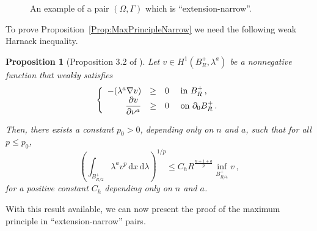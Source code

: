 \documentclass[twoside,leqno,symbols-for-thanks, draft]{rmi}
\numberwithin{equation}{section}
\newtheorem{proposition}[theorem]{Proposition}
\theoremstyle{definition}
\renewcommand{\d}{\,\mathrm{d}} %
\newcommand{\dx}{\,\mathrm{d}x} %
\newcommand\beqc[1]{\left\{\begin{array}{#1}}
\newcommand\eeqc{\end{array} \right.}
\def\PDEsystem{rcll}
\let\div\relax
\DeclareMathOperator{\div}{div}
\begin{document}
\begin{figure}
	
	\caption{An example of a pair $(\Omega,\Gamma)$ which is ``extension-narrow''\!.}
	\label{Fig:ExtensionNarrow}
\end{figure}


To prove Proposition~\ref{Prop:MaxPrincipleNarrow} we need the following weak Harnack inequality.

\begin{proposition}[Proposition 3.2 of \cite{TanXiong}]
	\label{Prop:WeakHarnack}
	Let $v \in H^1(B_R^+, \lambda^a)$ be a nonnegative function that weakly satisfies 
	$$
	\beqc{\PDEsystem}
	-\div(\lambda^a \nabla v) &\geq& 0 & \textrm{ in } B_R^+\,, \\
	\dfrac{\partial v}{\partial \nu^a} &\geq & 0 & \textrm{ on }  \partial_0 B_R^+\,.
	\eeqc
	$$
	
	Then, there exists a constant $p_0 > 0$, depending only on $n$ and $a$, such that for all $p\leq p_0$,
	\begin{equation}
	\label{Eq:WeakHarnack}
	\left( \int_{B_{R/2}^+} \lambda^a v^p \dx \d \lambda \right )^{1/p} \leq C_h R^{\frac{n+1+a}{p} } \inf_{B^+_{R/4}} v\,,
	\end{equation}
	for a positive constant $C_h$ depending only on $n$ and $a$.
\end{proposition}

With this result available, we can now present the proof of the maximum principle in ``extension-narrow'' pairs.
\end{document}
